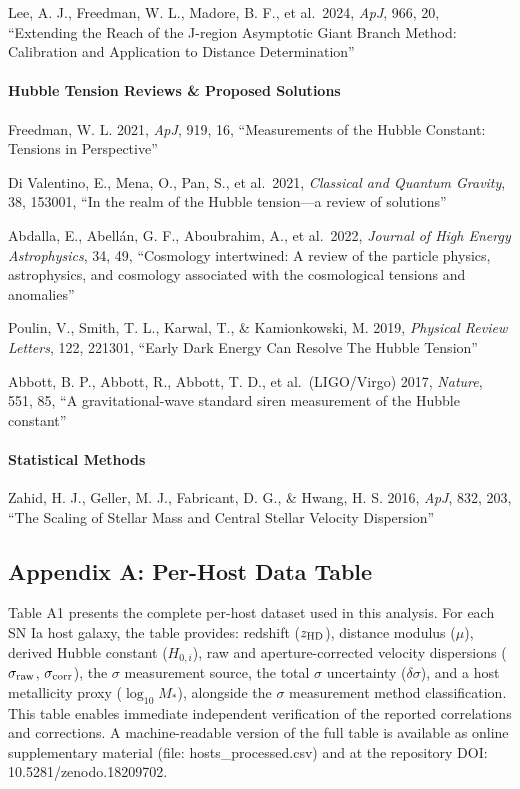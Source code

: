 \documentclass[
]{article}
\begin{document}
Lee, A. J., Freedman, W. L., Madore, B. F., et al.~2024, \emph{ApJ},
966, 20, ``Extending the Reach of the J-region Asymptotic Giant Branch
Method: Calibration and Application to Distance Determination''

\paragraph{Hubble Tension Reviews \& Proposed
Solutions}\label{hubble-tension-reviews-proposed-solutions}

Freedman, W. L. 2021, \emph{ApJ}, 919, 16, ``Measurements of the Hubble
Constant: Tensions in Perspective''

Di Valentino, E., Mena, O., Pan, S., et al.~2021, \emph{Classical and
Quantum Gravity}, 38, 153001, ``In the realm of the Hubble tension---a
review of solutions''

Abdalla, E., Abellán, G. F., Aboubrahim, A., et al.~2022, \emph{Journal
of High Energy Astrophysics}, 34, 49, ``Cosmology intertwined: A review
of the particle physics, astrophysics, and cosmology associated with the
cosmological tensions and anomalies''

Poulin, V., Smith, T. L., Karwal, T., \& Kamionkowski, M. 2019,
\emph{Physical Review Letters}, 122, 221301, ``Early Dark Energy Can
Resolve The Hubble Tension''

Abbott, B. P., Abbott, R., Abbott, T. D., et al.~(LIGO/Virgo) 2017,
\emph{Nature}, 551, 85, ``A gravitational-wave standard siren
measurement of the Hubble constant''

\paragraph{Statistical Methods}\label{statistical-methods}

Zahid, H. J., Geller, M. J., Fabricant, D. G., \& Hwang, H. S. 2016,
\emph{ApJ}, 832, 203, ``The Scaling of Stellar Mass and Central Stellar
Velocity Dispersion''

\subsection{Appendix A: Per-Host Data
Table}\label{appendix-a-per-host-data-table}

Table A1 presents the complete per-host dataset used in this analysis.
For each SN Ia host galaxy, the table provides: redshift
(\(z_{\rm HD}\)), distance modulus (\(\mu\)), derived Hubble constant
(\(H_{0,i}\)), raw and aperture-corrected velocity dispersions
(\(\sigma_{\rm raw}\), \(\sigma_{\rm corr}\)), the \(\sigma\)
measurement source, the total \(\sigma\) uncertainty (\(\delta\sigma\)),
and a host metallicity proxy (\(\log_{10} M_*\)), alongside the
\(\sigma\) measurement method classification. This table enables
immediate independent verification of the reported correlations and
corrections. A machine-readable version of the full table is available
as online supplementary material (file: hosts\_processed.csv) and at the
repository DOI: 10.5281/zenodo.18209702.
\end{document}

